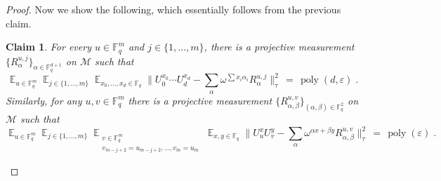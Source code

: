 \documentclass[11pt]{article}
\newtheorem{claim}[theorem]{Claim}
\theoremstyle{definition}
\DeclareMathOperator*{\Expectation}{\mathbb{E}}
\newcommand{\Es}[1]{\Expectation_{#1}}
\newcommand{\F}{\ensuremath{\mathbb{F}}}
\newcommand{\mM}{\ensuremath{\mathcal{M}}}
\DeclareMathOperator{\poly}{poly}
\newcommand{\eps}{\varepsilon}
\begin{document}
\begin{proof}
Now we show the following, which essentially follows from the previous claim. 

\begin{claim}\label{claim:z2-stab-3}
For every $u\in \F_q^m$ and $j\in\{1,\ldots,m\}$, there is a projective measurement $\{R^{u,j}_\alpha\}_{\alpha\in\F_q^{d+1}}$ on $\mM$ such that 
\[ \Es{u\in \F_q^m} \Es{j\in\{1,\ldots,m\}} \Es{x_0,\ldots,x_{d}\in \F_q} \Big\| U_0^{x_0}\cdots U_d^{x_d} -  \sum_{\alpha} \omega^{\sum x_i\alpha_i} R^{u,j}_\alpha\Big\|_\tau^2 \,=\, \poly(d,\eps)\;.\]
Similarly, for any $u,v\in \F_q^m$ there is a projective measurement $\{R^{u,v}_{\alpha,\beta}\}_{(\alpha,\beta)\in\F_q^{2}}$ on $\mM$ such that 
\[  \Es{u\in \F_q^m} \Es{j\in\{1,\ldots,m\}} \Es{\substack{v\in \F_q^m \\v_{m-j+2}=u_{m-j+2},\ldots,v_m=u_m}} \Es{x,y\in \F_q} \Big\| U_u^{x}  U_v^{y} -  \sum_{\alpha} \omega^{ \alpha x + \beta y} R^{u,v}_{\alpha,\beta}\Big\|_\tau^2 \,=\, \poly(\eps)\;.\]
\end{claim}


\end{proof}
\end{document}
